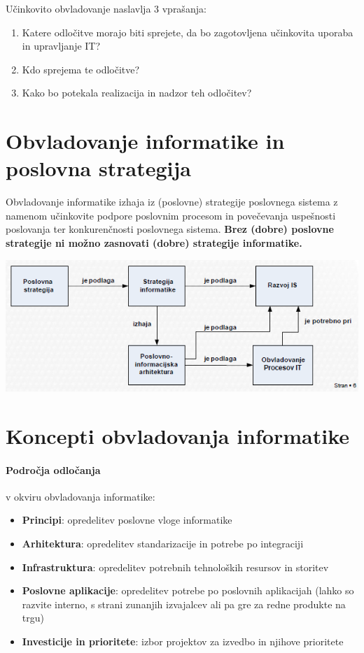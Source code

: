 \documentclass[a4paper,12pt]{report}
\begin{document}
Učinkovito obvladovanje naslavlja 3 vprašanja:
\begin{enumerate}
   \item Katere odločitve morajo biti sprejete, da bo zagotovljena učinkovita uporaba in upravljanje IT?
   \item Kdo sprejema te odločitve?
   \item Kako bo potekala realizacija in nadzor teh odločitev?
\end{enumerate}

\section{Obvladovanje informatike in poslovna strategija}

Obvladovanje informatike izhaja iz (poslovne) strategije poslovnega sistema z namenom učinkovite podpore poslovnim procesom in povečevanja uspešnosti poslovanja ter konkurenčnosti poslovnega sistema.
\textbf{Brez (dobre) poslovne strategije ni možno zasnovati (dobre) strategije informatike.}

\includegraphics[scale=0.75]{001.png}

\section{Koncepti obvladovanja informatike}

\paragraph{Področja odločanja} v okviru obvladovanja informatike:
\begin{itemize}
   \item \textbf{Principi}: opredelitev poslovne vloge informatike
   \item \textbf{Arhitektura}: opredelitev standarizacije in potrebe po integraciji
   \item \textbf{Infrastruktura}: opredelitev potrebnih tehnoloških resursov in storitev
   \item \textbf{Poslovne aplikacije}: opredelitev potrebe po poslovnih aplikacijah (lahko so razvite interno, s strani zunanjih izvajalcev ali pa gre za redne produkte na trgu)
   \item \textbf{Investicije in prioritete}: izbor projektov za izvedbo in njihove prioritete
\end{itemize}
\end{document}
